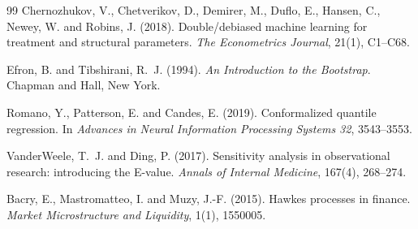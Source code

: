 \begin{thebibliography}{99}
 Chernozhukov, V., Chetverikov, D., Demirer, M., Duflo, E., Hansen, C., Newey, W.
and Robins, J. (2018). Double/debiased machine learning for treatment and structural parameters.
\emph{The Econometrics Journal}, 21(1), C1--C68.

 Efron, B. and Tibshirani, R.~J. (1994). \emph{An Introduction to the Bootstrap}.
Chapman and Hall, New York.

 Romano, Y., Patterson, E. and Candes, E. (2019). Conformalized quantile regression.
In \emph{Advances in Neural Information Processing Systems 32}, 3543--3553.

 VanderWeele, T.~J. and Ding, P. (2017). Sensitivity analysis in observational
research: introducing the E-value. \emph{Annals of Internal Medicine}, 167(4), 268--274.

 Bacry, E., Mastromatteo, I. and Muzy, J.-F. (2015). Hawkes processes in finance.
\emph{Market Microstructure and Liquidity}, 1(1), 1550005.

\end{thebibliography}
